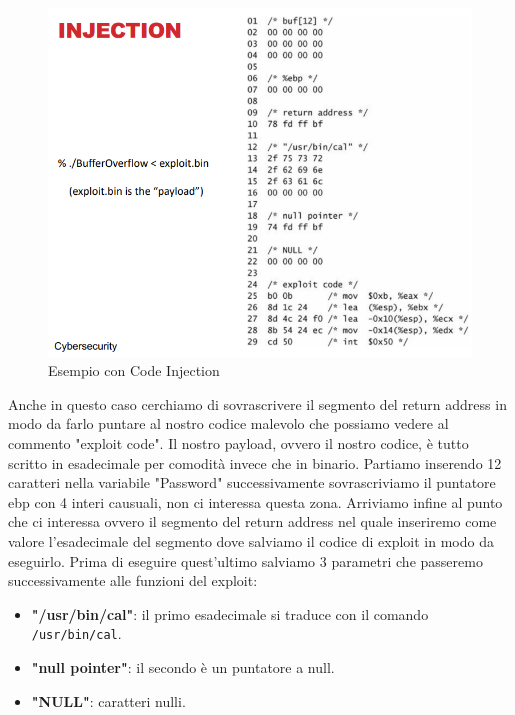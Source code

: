 \begin{figure}[H]
	\centering
    \includegraphics[width=12cm, keepaspectratio]{santini/img/cap_2/es_pass_ok_code_inj.png}
	\caption{Esempio con Code Injection}\label{fig:es_pass_ok_code_inj}
\end{figure}
Anche in questo caso cerchiamo di sovrascrivere il segmento del return address in modo da farlo puntare al nostro codice malevolo che possiamo vedere al commento "exploit code". Il nostro payload, ovvero il nostro codice, è tutto scritto in esadecimale per comodità invece che in binario. Partiamo inserendo 12 caratteri nella variabile "Password" successivamente sovrascriviamo il puntatore ebp con 4 interi causuali, non ci interessa questa zona. Arriviamo infine al punto che ci interessa ovvero il segmento del return address nel quale inseriremo come valore l'esadecimale del segmento dove salviamo il codice di exploit in modo da eseguirlo. Prima di eseguire quest'ultimo salviamo 3 parametri che passeremo successivamente alle funzioni del exploit:
\begin{itemize}
    \item \textbf{"/usr/bin/cal"}: il primo esadecimale si traduce con il comando \verb|/usr/bin/cal|.
    \item \textbf{"null pointer"}: il secondo è un puntatore a null.
    \item \textbf{"NULL"}: caratteri nulli.
\end{itemize}

